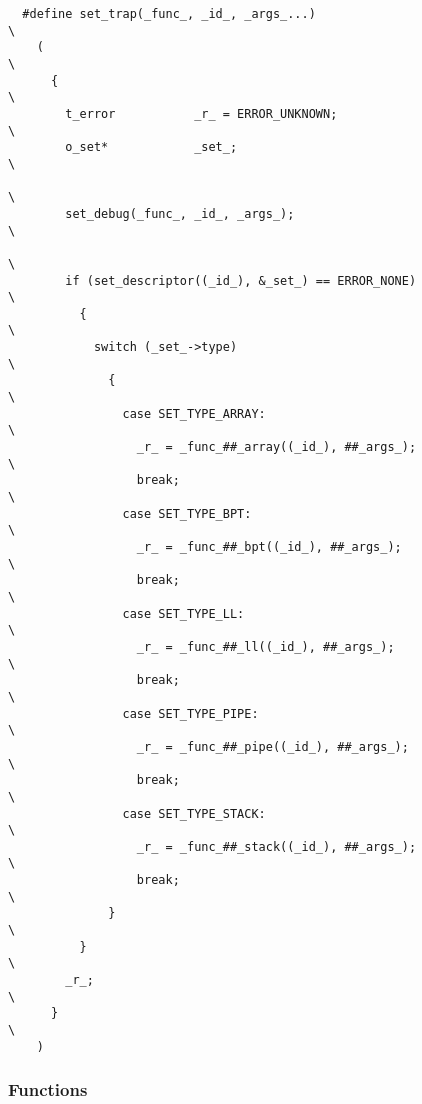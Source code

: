\begin{verbatim}
  #define set_trap(_func_, _id_, _args_...)                               \
    (                                                                     \
      {                                                                   \
        t_error           _r_ = ERROR_UNKNOWN;                            \
        o_set*            _set_;                                          \
                                                                          \
        set_debug(_func_, _id_, _args_);                                  \
                                                                          \
        if (set_descriptor((_id_), &_set_) == ERROR_NONE)                 \
          {                                                               \
            switch (_set_->type)                                          \
              {                                                           \
                case SET_TYPE_ARRAY:                                      \
                  _r_ = _func_##_array((_id_), ##_args_);                 \
                  break;                                                  \
                case SET_TYPE_BPT:                                        \
                  _r_ = _func_##_bpt((_id_), ##_args_);                   \
                  break;                                                  \
                case SET_TYPE_LL:                                         \
                  _r_ = _func_##_ll((_id_), ##_args_);                    \
                  break;                                                  \
                case SET_TYPE_PIPE:                                       \
                  _r_ = _func_##_pipe((_id_), ##_args_);                  \
                  break;                                                  \
                case SET_TYPE_STACK:                                      \
                  _r_ = _func_##_stack((_id_), ##_args_);                 \
                  break;                                                  \
              }                                                           \
          }                                                               \
        _r_;                                                              \
      }                                                                   \
    )
\end{verbatim}


\subsubsection{Functions}

